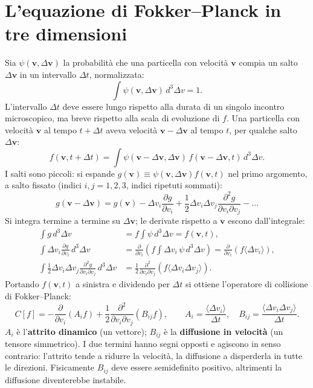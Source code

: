 \section{L'equazione di Fokker--Planck in tre dimensioni}
Sia $\psi(\mathbf{v},\Delta\mathbf{v})$ la probabilità che una particella con velocità $\mathbf{v}$ compia un salto $\Delta\mathbf{v}$ in un intervallo $\Delta t$, normalizzata:
\begin{equation}
\int\psi(\mathbf{v},\Delta\mathbf{v})\,d^3\Delta v=1.
\end{equation}
L'intervallo $\Delta t$ deve essere lungo rispetto alla durata di un singolo incontro microscopico, ma breve rispetto alla scala di evoluzione di $f$. Una particella con velocità $\mathbf{v}$ al tempo $t+\Delta t$ aveva velocità $\mathbf{v}-\Delta\mathbf{v}$ al tempo $t$, per qualche salto $\Delta\mathbf{v}$:
\begin{equation}
f(\mathbf{v},t+\Delta t)=\int\psi(\mathbf{v}-\Delta\mathbf{v},\Delta\mathbf{v})\,f(\mathbf{v}-\Delta\mathbf{v},t)\,d^3\Delta v.
\end{equation}
I salti sono piccoli: si espande $g(\mathbf{v})\equiv\psi(\mathbf{v},\Delta\mathbf{v})f(\mathbf{v},t)$ nel primo argomento, a salto fissato (indici $i,j=1,2,3$, indici ripetuti sommati):
\begin{equation}
g(\mathbf{v}-\Delta\mathbf{v})=g(\mathbf{v})-\Delta v_i\frac{\partial g}{\partial v_i}+\frac12\Delta v_i\Delta v_j\frac{\partial^2g}{\partial v_i\partial v_j}-\dots
\end{equation}
Si integra termine a termine su $\Delta\mathbf{v}$; le derivate rispetto a $\mathbf{v}$ escono dall'integrale:
\begin{align}
\int g\,d^3\Delta v&=f\int\psi\,d^3\Delta v=f(\mathbf{v},t),\\
\int\Delta v_i\frac{\partial g}{\partial v_i}\,d^3\Delta v&=\frac{\partial}{\partial v_i}\left(f\int\Delta v_i\,\psi\,d^3\Delta v\right)=\frac{\partial}{\partial v_i}\left(f\langle\Delta v_i\rangle\right),\\
\int\frac12\Delta v_i\Delta v_j\frac{\partial^2g}{\partial v_i\partial v_j}\,d^3\Delta v&=\frac12\frac{\partial^2}{\partial v_i\partial v_j}\left(f\langle\Delta v_i\Delta v_j\rangle\right).
\end{align}
Portando $f(\mathbf{v},t)$ a sinistra e dividendo per $\Delta t$ si ottiene l'operatore di collisione di Fokker--Planck:
\begin{equation}
C[f]=-\frac{\partial}{\partial v_i}\left(A_if\right)+\frac12\frac{\partial^2}{\partial v_i\partial v_j}\left(B_{ij}f\right),\qquad A_i=\frac{\langle\Delta v_i\rangle}{\Delta t},\quad B_{ij}=\frac{\langle\Delta v_i\Delta v_j\rangle}{\Delta t}.
\end{equation}
$A_i$ è l'\textbf{attrito dinamico} (un vettore); $B_{ij}$ è la \textbf{diffusione in velocità} (un tensore simmetrico). I due termini hanno segni opposti e agiscono in senso contrario: l'attrito tende a ridurre la velocità, la diffusione a disperderla in tutte le direzioni. Fisicamente $B_{ij}$ deve essere semidefinito positivo, altrimenti la diffusione diventerebbe instabile.


